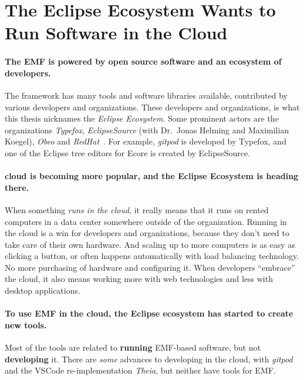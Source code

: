 \section{The Eclipse Ecosystem Wants to Run Software in the Cloud}

\paragraph{The \acrlong{EMF} is powered by \gls{open source} software and an ecosystem of developers.}
The framework has many tools and software libraries available, contributed by various developers and organizations.
These developers and organizations, is what this thesis nicknames the \textit{Eclipse Ecosystem}.
Some prominent actors are the organizations \textit{Typefox}, \textit{EclipseSource} (with Dr.\ Jonas Helming and Maximilian Koegel), \textit{Obeo} and \textit{RedHat}~\cite{rekstadModelingEnvironmentCloud2020}.
For example, \textit{gitpod} is developed by Typefox, and one of the \gls{Eclipse} tree editors for \gls{Ecore} is created by EclipseSource.

\paragraph{\Gls{cloud} is becoming more popular, and the Eclipse Ecosystem is heading there.}
When something \textit{runs in the \gls{cloud}}, it really means that it runs on rented computers in a data center somewhere outside of the organization.
Running in the cloud is a win for developers and organizations, because they don't need to take care of their own hardware.
And scaling up to more computers is as easy as clicking a button, or often happens automatically with load balancing technology.
No more purchasing of hardware and configuring it.
When developers ``embrace'' the \gls{cloud}, it also means working more with web technologies and less with desktop applications.

\paragraph{To use \acrshort{EMF} in the cloud, the Eclipse ecosystem has started to create new tools.}
Most of the tools are related to \textbf{running} \acrshort{EMF}-based software, but not \textbf{developing} it.
There are \textit{some} advances to developing in the cloud, with \textit{gitpod} and the \gls{VSCode} re-implementation \textit{\gls{Theia}}, but neither have tools for \acrshort{EMF}.


